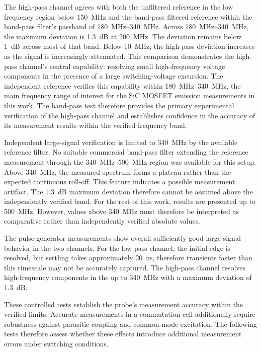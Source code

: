 The high-pass channel agrees with both the unfiltered reference in the low frequency region below \SI{150}{MHz} and the band-pass filtered reference within the band-pass filter's passband of \SIrange{180}{340}{MHz}.
Across \SIrange{180}{340}{MHz}, the maximum deviation is \SI{1.3}{dB} at \SI{200}{MHz}.
The deviation remains below \SI{1}{dB} across most of that band.
Below \SI{10}{MHz}, the high-pass deviation increases as the signal is increasingly attenuated.
This comparison demonstrates the high-pass channel's central capability: resolving small high-frequency voltage components in the presence of a large switching-voltage excursion.
The independent reference verifies this capability within \SIrange{180}{340}{MHz}, the main frequency range of interest for the SiC MOSFET emission measurements in this work.
The band-pass test therefore provides the primary experimental verification of the high-pass channel and establishes confidence in the accuracy of its measurement results within the verified frequency band.

Independent large-signal verification is limited to \SI{340}{MHz} by the available reference filter.
No suitable commercial band-pass filter extending the reference measurement through the \SIrange{340}{500}{MHz} region was available for this setup.
Above \SI{340}{MHz}, the measured spectrum forms a plateau rather than the expected continuous roll-off.
This feature indicates a possible measurement artifact.
The \SI{1.3}{dB} maximum deviation therefore cannot be assumed above the independently verified band.
For the rest of this work, results are presented up to \SI{500}{MHz}.
However, values above \SI{340}{MHz} must therefore be interpreted as comparative rather than independently verified absolute values.

The pulse-generator measurements show overall sufficiently good large-signal behavior in the two channels.
For the low-pass channel, the initial edge is resolved, but settling takes approximately \SI{20}{ns}, therefore transients faster than this timescale may not be accurately captured.
The high-pass channel resolves high-frequency components in the up to \SI{340}{MHz} with a maximum deviation of \SI{1.3}{dB}.

These controlled tests establish the probe's measurement accuracy within the verified limits.
Accurate measurements in a commutation cell additionally require robustness against parasitic coupling and common-mode excitation.
The following tests therefore assess whether these effects introduce additional measurement errors under switching conditions.












